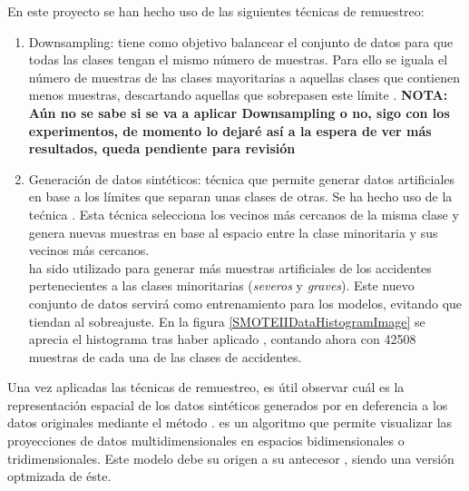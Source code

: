             En este proyecto se han hecho uso de las siguientes técnicas de remuestreo:

            
            \begin{enumerate}



                \item Downsampling: tiene como objetivo balancear el conjunto de datos para que todas las clases tengan el mismo número de muestras. Para ello se iguala el número de muestras de las clases mayoritarias a aquellas clases que contienen menos muestras, descartando aquellas que sobrepasen este límite \cite{Downsampling}. \textbf{NOTA: Aún no se sabe si se va a aplicar Downsampling o no, sigo con los experimentos, de momento lo dejaré así a la espera de ver más resultados, queda pendiente para revisión}
                

                \item Generación de datos sintéticos: técnica que permite generar datos artificiales en base a los límites que separan unas clases de otras. Se ha hecho uso de la tećnica  \cite{SMOTEII}. Esta técnica selecciona los vecinos más cercanos de la misma clase y genera nuevas muestras en base al espacio entre la clase minoritaria y sus vecinos más cercanos.\\

                 ha sido utilizado para generar más muestras artificiales de los accidentes pertenecientes a las clases minoritarias (\textit{severos} y \textit{graves}). Este nuevo conjunto de datos servirá como entrenamiento para los modelos, evitando que tiendan al sobreajuste. En la figura \ref{SMOTEIIDataHistogramImage} se aprecia el histograma tras haber aplicado , contando ahora con 42508 muestras de cada una de las clases de accidentes.
    
            \end{enumerate}


            Una vez aplicadas las técnicas de remuestreo, es útil observar cuál es la representación espacial de los datos sintéticos generados por  en deferencia a los datos originales mediante el método  \cite{TSNEPaper}.  es un algoritmo que permite visualizar las proyecciones de datos multidimensionales en espacios bidimensionales o tridimensionales. Este modelo debe su origen a su antecesor , siendo una versión optmizada de éste.

